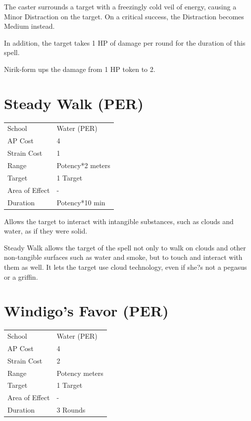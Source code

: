 \documentclass[11pt,a4paper,twocolumn]{book}
\begin{document}
	\medskip
	
	The caster surrounds a target with a freezingly cold veil of energy, causing a Minor Distraction on the target. On a critical success, the Distraction becomes Medium instead.
	
	In addition, the target takes 1 HP of damage per round for the duration of this spell.
	
	Nirik-form ups the damage from 1 HP token to 2.
	
				\section*{Steady Walk (PER)}
	{
		\begin{tabu} to 75mm{| X[l,4] | X[l,7] |}
			\hline
			School 			&  Water (PER)			\\
			AP Cost	      	&  4					\\
			Strain Cost     &  1					\\
			Range     		&  Potency*2 meters		\\
			Target      	&  1 Target				\\
			Area of Effect  &  -	 				\\
			Duration     	&  Potency*10 min		\\ \hline
		\end{tabu}
		
	}
	
	\medskip
	
	Allows the target to interact with intangible substances, such as clouds and water, as if they were solid.
	
	Steady Walk allows the target of the spell not only to walk on clouds and other non-tangible surfaces such as water and smoke, but to touch and interact with them as well. It lets the target use cloud technology, even if she?s not a pegasus or a griffin.
	
					\section*{Windigo's Favor (PER)}
	{
		\begin{tabu} to 75mm{| X[l,4] | X[l,7] |}
			\hline
			School 			&  Water (PER)			\\
			AP Cost	      	&  4					\\
			Strain Cost     &  2					\\
			Range     		&  Potency meters		\\
			Target      	&  1 Target				\\
			Area of Effect  &  -	 				\\
			Duration     	&  3 Rounds				\\ \hline
		\end{tabu}
		
	}
	
\end{document}

